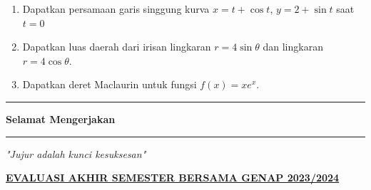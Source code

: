 \documentclass[10pt,openany,a4paper]{article}
\theoremstyle{definition}
\theoremstyle{definition}
\theoremstyle{plain}
\begin{document}
\begin{enumerate}
\begin{center}
\end{center}
    \item Dapatkan persamaan garis singgung kurva $x=t+\cos t$, $y=2+\sin t$ saat $t=0$
    \item Dapatkan luas daerah dari irisan lingkaran $r=4\sin\theta$ dan lingkaran $r=4\cos\theta$.
    \item Dapatkan deret Maclaurin untuk fungsi $f(x)=xe^x$.
\end{enumerate}
\vfill
\begin{center}
    \noindent\rule{0.366416\linewidth}{2pt} \textbf{ Selamat Mengerjakan } \rule{0.366416\linewidth}{2pt}
\end{center}
\begin{center}
    \textit{"Jujur adalah kunci kesuksesan"}
\end{center}

\newpage
\begin{center}
	{\underline
{\textbf{\MakeUppercase{EVALUASI AKHIR SEMESTER BERSAMA GENAP 2023/2024}}}}
    \end{center}
\end{document}
